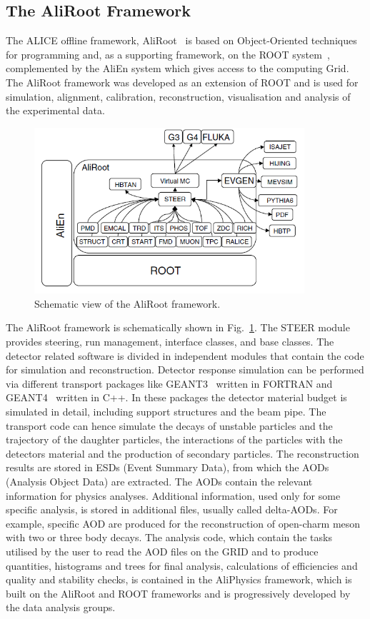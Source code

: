 \subsection{The AliRoot Framework}
\label{subsec:AliRoot}
The ALICE offline framework, AliRoot~\cite{Aamodt:2008zz} is based on Object-Oriented techniques
 for programming and, as a supporting framework, on the ROOT system~\cite{Brun:1997pa}, 
 complemented by the AliEn system which gives access to the computing Grid. The 
 AliRoot framework was developed as an extension of ROOT and is used for simulation, 
 alignment, calibration, reconstruction, visualisation and analysis of the experimental data.
\begin{figure}[h]
\centering
\includegraphics[width=10cm]{FigCap3/aliroot.png}
\caption{Schematic view of the AliRoot framework.}
\label{fig:aliroot}
\end{figure}
The AliRoot framework is schematically shown in Fig.~\ref{fig:aliroot}. The STEER module 
provides steering, run management, interface classes, and base classes. The detector related software is divided in 
independent modules that contain the code for simulation and reconstruction. Detector response simulation can be performed 
via different transport  packages like GEANT3~\cite{Brun:1082634} 
written in FORTRAN and GEANT4~\cite{Agostinelli:2002hh} written in C++. In these packages 
the detector material budget is simulated in detail, including support structures and 
the beam pipe. The transport code can hence simulate the decays of unstable 
particles and the trajectory of the daughter particles, the interactions of the 
particles with the detectors material and the production of secondary particles.
The reconstruction results are stored in ESDs (Event Summary Data), from which 
the AODs (Analysis Object Data) are extracted. The AODs contain the relevant information
for physics analyses. Additional information, used only for some specific analysis, is stored in additional
files, usually called delta-AODs. For example, specific AOD are produced for the 
reconstruction of open-charm meson with two or three body decays.
The analysis code, which contain the tasks utilised by the user to read the AOD files on the GRID and
to produce quantities, histograms and trees for final analysis, calculations of efficiencies and quality and
stability checks, is contained in the AliPhysics framework, which is built on the AliRoot and ROOT
frameworks and is progressively developed by the data analysis groups.
